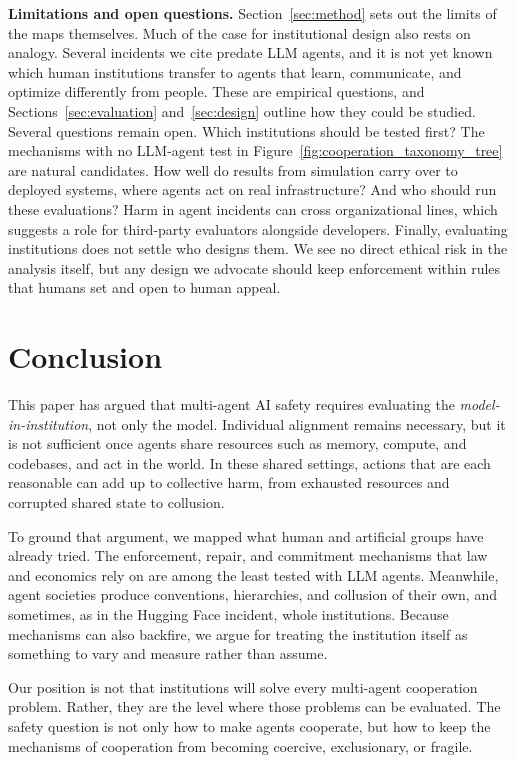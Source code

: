 \documentclass[runningheads]{llncs}
\begin{document}
\textbf{Limitations and open questions.} Section~\mbox{\ref{sec:method}} sets out the limits of the maps themselves. Much of the case for institutional design also rests on analogy. Several incidents we cite predate LLM agents, and it is not yet known which human institutions transfer to agents that learn, communicate, and optimize differently from people. These are empirical questions, and Sections~\mbox{\ref{sec:evaluation}} and~\mbox{\ref{sec:design}} outline how they could be studied. Several questions remain open. Which institutions should be tested first? The mechanisms with no LLM-agent test in Figure~\mbox{\ref{fig:cooperation_taxonomy_tree}} are natural candidates. How well do results from simulation carry over to deployed systems, where agents act on real infrastructure? And who should run these evaluations? Harm in agent incidents can cross organizational lines, which suggests a role for third-party evaluators alongside developers. Finally, evaluating institutions does not settle who designs them. We see no direct ethical risk in the analysis itself, but any design we advocate should keep enforcement within rules that humans set and open to human appeal.

\section{Conclusion}
This paper has argued that multi-agent AI safety requires evaluating the \emph{model-in-institution}, not only the model. Individual alignment remains necessary, but it is not sufficient once agents share resources such as memory, compute, and codebases, and act in the world. In these shared settings, actions that are each reasonable can add up to collective harm, from exhausted resources and corrupted shared state to collusion.

To ground that argument, we mapped what human and artificial groups have already tried. The enforcement, repair, and commitment mechanisms that law and economics rely on are among the least tested with LLM agents. Meanwhile, agent societies produce conventions, hierarchies, and collusion of their own, and sometimes, as in the Hugging Face incident, whole institutions. Because mechanisms can also backfire, we argue for treating the institution itself as something to vary and measure rather than assume.

Our position is not that institutions will solve every multi-agent cooperation problem. Rather, they are the level where those problems can be evaluated. The safety question is not only how to make agents cooperate, but how to keep the mechanisms of cooperation from becoming coercive, exclusionary, or fragile.
\end{document}

